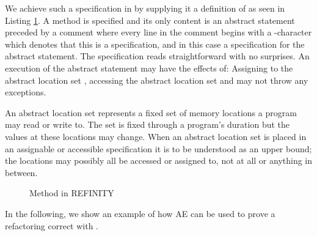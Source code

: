 We achieve such a specification in \Refinity{} by supplying it a definition of  as seen in Listing \ref{lst:ExtractVariable-refinity-method}.
A method is specified and its only content is an abstract statement  preceded by a comment where every line in the
comment begins with a -character which denotes that this is a specification, and in this case a specification for the abstract statement.
The specification reads straightforward with no surprises. An execution of the abstract statement  may have the effects of: Assigning to the
abstract location set , accessing the abstract location set  and may not throw any exceptions.

An abstract location set represents a fixed set of memory locations a program may read or write to.
The set is fixed through a program's duration but the values at these locations may change.
When an abstract location set is placed in an assignable or accessible specification it is to be understood as an upper bound;
the locations may possibly all be accessed or assigned to, not at all or anything in between.

\begin{figure}[tbp]
  \centering
  \captionsetup{type=lstlisting}
  \begin{sublstlisting}{.65\linewidth}
  
  \end{sublstlisting}
  \caption{Method in REFINITY}
  \label{lst:ExtractVariable-refinity-method}
\end{figure}


In the following, we show an example of how AE can be used to prove a refactoring correct with \Refinity{}. 

